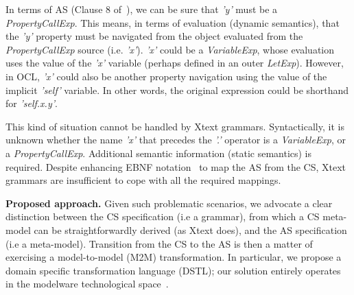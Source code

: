 \documentclass{llncs}
\begin{document}
In terms of AS (Clause 8 of~\cite{omg2014ocl}), we can be sure that \textit{'y'} must be a \textit{PropertyCallExp}. This means, in terms of evaluation (dynamic semantics), that the \textit{'y'} property must be navigated from the object evaluated from the \textit{PropertyCallExp} source (i.e. \textit{'x'}). \textit{'x'} could be a \textit{VariableExp}, whose evaluation uses the value of the \textit{'x'} variable (perhaps defined in an outer \textit{LetExp}). However, in OCL, \textit{'x'} could also be another property navigation using the value of the implicit \textit{'self'} variable. In other words, the original expression could be shorthand for \textit{'self.x.y'}.

This kind of situation cannot be handled by Xtext grammars. Syntactically, it is unknown whether the name \textit{'x'} that precedes the \textit{'.'} operator is a \textit{VariableExp}, or a \textit{PropertyCallExp}. Additional semantic information (static semantics) is required. Despite enhancing EBNF notation~\cite{wirth1996ebnf} to map the AS from the CS, Xtext grammars are insufficient to cope with all the required mappings.%


\textbf{Proposed approach.}
Given such problematic scenarios, we advocate a clear distinction between the CS specification (i.e a grammar), from which a CS meta-model can be straightforwardly derived (as Xtext does), and the AS specification (i.e a meta-model). Transition from the CS to the AS is then a matter of exercising a model-to-model (M2M) transformation. In particular, we propose a domain specific transformation language (DSTL); our solution entirely operates in the modelware technological space~\cite{bezivin2006mdeTS}.
\end{document}
